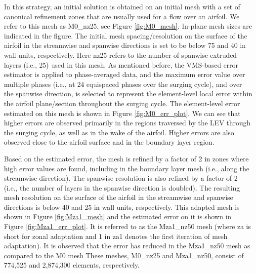 In this strategy, an initial solution is obtained on an initial mesh with a set of canonical refinement zones that are usually used for a flow over an airfoil. We refer to this mesh as M0\_nz25, see Figure \ref{fig:M0_mesh}. In-plane mesh sizes are indicated in the figure. The initial mesh spacing/resolution on the surface of the airfoil in the streamwise and spanwise directions is set to be below 75 and 40 in wall units, respectively.
Here nz25 refers to the number of spanwise extruded layers (i.e., 25) used in this mesh. 
As mentioned before, the VMS-based error estimator is applied to phase-averaged data, and the maximum error value over multiple phases (i.e., at 24 equispaced phases over the surging cycle), and over the spanwise direction, is selected to represent the element-level local error within the airfoil plane/section throughout the surging cycle. 
The element-level error estimated on this mesh is shown in Figure \ref{fig:M0_err_plot}. 
We can see that higher errors are observed primarily in the regions traversed by the LEV through the surging cycle, as well as in the wake of the airfoil. 
Higher errors are also observed close to the airfoil surface and in the boundary layer region.

Based on the estimated error, the mesh is refined by a factor of 2 in zones where high error values are found, including in the boundary layer mesh (i.e., along the streamwise direction). 
The spanwise resolution is also refined by a factor of 2 (i.e., the number of layers in the spanwise direction is doubled). 
The resulting mesh resolution on the surface of the airfoil in the streamwise and spanwise directions is below 40 and 25 in wall units, respectively.
This adapted mesh is shown in Figure \ref{fig:Mza1_mesh} and the estimated error on it is shown in Figure \ref{fig:Mza1_err_plot}. It is referred to as the Mza1\_nz50 mesh (where za is short for zonal adaptation and 1 in za1 denotes the first iteration of mesh adaptation).
It is observed that the error has reduced in the Mza1\_nz50 mesh as compared to the M0 mesh
These meshes, M0\_nz25 and Mza1\_nz50, consist of 774,525 and 2,874,300 elements, respectively.


